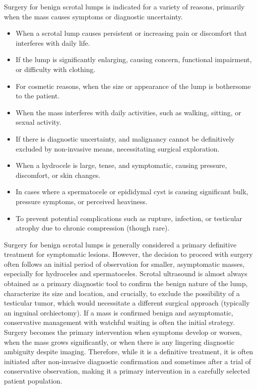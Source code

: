 Surgery for benign scrotal lumps is indicated for a variety of reasons, primarily when the mass causes symptoms or diagnostic uncertainty.

\begin{itemize}
  \item When a scrotal lump causes persistent or increasing pain or discomfort that interferes with daily life.
  \item If the lump is significantly enlarging, causing concern, functional impairment, or difficulty with clothing.
  \item For cosmetic reasons, when the size or appearance of the lump is bothersome to the patient.
  \item When the mass interferes with daily activities, such as walking, sitting, or sexual activity.
  \item If there is diagnostic uncertainty, and malignancy cannot be definitively excluded by non-invasive means, necessitating surgical exploration.
  \item When a hydrocele is large, tense, and symptomatic, causing pressure, discomfort, or skin changes.
  \item In cases where a spermatocele or epididymal cyst is causing significant bulk, pressure symptoms, or perceived heaviness.
  \item To prevent potential complications such as rupture, infection, or testicular atrophy due to chronic compression (though rare).
\end{itemize}

Surgery for benign scrotal lumps is generally considered a primary definitive treatment for symptomatic lesions. However, the decision to proceed with surgery often follows an initial period of observation for smaller, asymptomatic masses, especially for hydroceles and spermatoceles. Scrotal ultrasound is almost always obtained as a primary diagnostic tool to confirm the benign nature of the lump, characterize its size and location, and crucially, to exclude the possibility of a testicular tumor, which would necessitate a different surgical approach (typically an inguinal orchiectomy). If a mass is confirmed benign and asymptomatic, conservative management with watchful waiting is often the initial strategy. Surgery becomes the primary intervention when symptoms develop or worsen, when the mass grows significantly, or when there is any lingering diagnostic ambiguity despite imaging. Therefore, while it is a definitive treatment, it is often initiated after non-invasive diagnostic confirmation and sometimes after a trial of conservative observation, making it a primary intervention in a carefully selected patient population.

